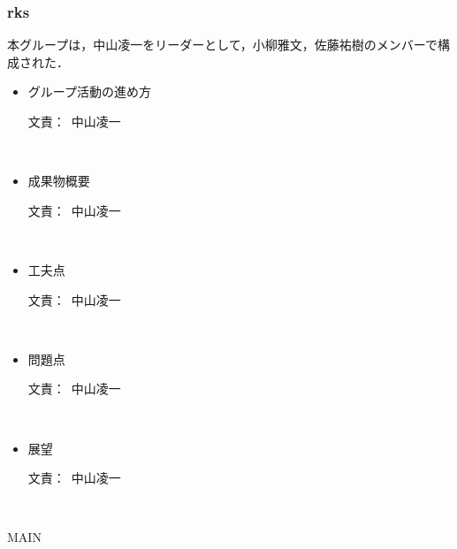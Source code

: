 \documentclass[a4paper]{jarticle}
\newcommand{\resp}[1]{\begin{flushright}文責：~#1\end{flushright}~\\}
\begin{document}
\fi

\subsubsection{rks}
    
    本グループは，中山凌一をリーダーとして，小柳雅文，佐藤祐樹のメンバーで構成された．

    \begin{itemize}
        \item グループ活動の進め方
        
        \resp{中山凌一}


        \item 成果物概要
        
        \resp{中山凌一}


        \item 工夫点
        
        \resp{中山凌一}


        \item 問題点
        
        \resp{中山凌一}


        \item 展望
        
        \resp{中山凌一}


    \end{itemize}

\expandafter\ifx\csname MAIN \endcsname\relax
  
\end{document}
